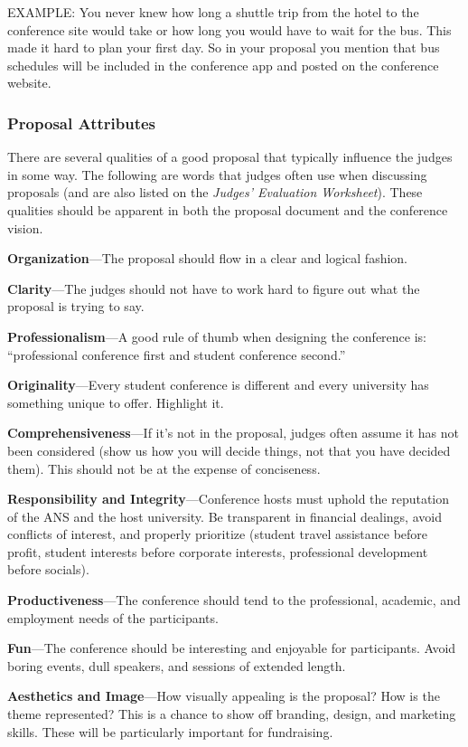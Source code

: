 \documentclass[12pt]{article}
\begin{document}
EXAMPLE: You never knew how long a shuttle trip from the hotel to the conference site would take or how long you would have to wait for the bus. This made it hard to plan your first day. So in your proposal you mention that bus schedules will be included in the conference app and posted on the conference website.

\subsubsection{Proposal Attributes}
There are several qualities of a good proposal that typically influence the judges in some way. The following are words that judges often use when discussing proposals (and are also listed on the \emph{Judges' Evaluation Worksheet}). These qualities should be apparent in both the proposal document and the conference vision.

\textbf{Organization}---The proposal should flow in a clear and logical fashion.

\textbf{Clarity}---The judges should not have to work hard to figure out what the proposal is trying to say.

\textbf{Professionalism}---A good rule of thumb when designing the conference is: “professional conference first and student conference second.”

\textbf{Originality}---Every student conference is different and every university has something unique to offer. Highlight it.

\textbf{Comprehensiveness}---If it’s not in the proposal, judges often assume it has not been considered (show us how you will decide things, not that you have decided them). This should not be at the expense of conciseness.

\textbf{Responsibility and Integrity}---Conference hosts must uphold the reputation of the ANS and the host university. Be transparent in financial dealings, avoid conflicts of interest, and properly prioritize (student travel assistance before profit, student interests before corporate
interests, professional development before socials).

\textbf{Productiveness}---The conference should tend to the professional, academic, and employment needs of the participants.

\textbf{Fun}---The conference should be interesting and enjoyable for participants. Avoid boring events, dull speakers, and sessions of extended length.

\textbf{Aesthetics and Image}---How visually appealing is the proposal? How is the theme represented? This is a chance to show off branding, design, and marketing skills. These will be particularly important for fundraising.
\end{document}
